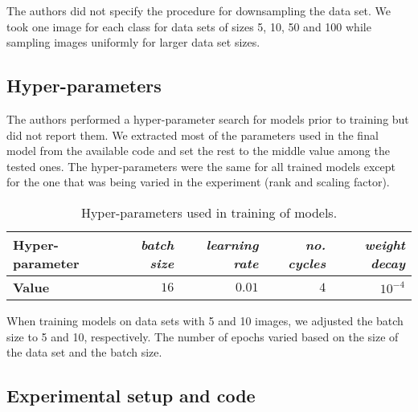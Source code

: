 The authors did not specify the procedure for downsampling the data set.
We took one image for each class for data sets of sizes 5, 10, 50 and 100 while sampling images uniformly for larger data set sizes.

\subsection{Hyper-parameters}

The authors performed a hyper-parameter search for models prior to training but did not report them.
We extracted most of the parameters used in the final model from the available code and set the rest to the middle value among the tested ones. The hyper-parameters were the same for all trained models except for the one that was being varied in the experiment (rank and scaling factor).

\begin{table}[ht]
    \centering
    \begin{tabular}{l r r r r}
        \toprule
        \textbf{Hyper-parameter} & \textit{batch size} & \textit{ learning rate} & \textit{no. cycles} & \textit{weight decay} \\
        \midrule
        \textbf{Value} & $16$ & $0.01$ & $4$ & $10^{-4}$\\
        \bottomrule
    \end{tabular}
    \caption{Hyper-parameters used in training of models.}
    \label{tab:hyper}
\end{table}

When training models on data sets with 5 and 10 images, we adjusted the batch size to 5 and 10, respectively. The number of epochs varied based on the size of the data set and the batch size.

\subsection{Experimental setup and code}

